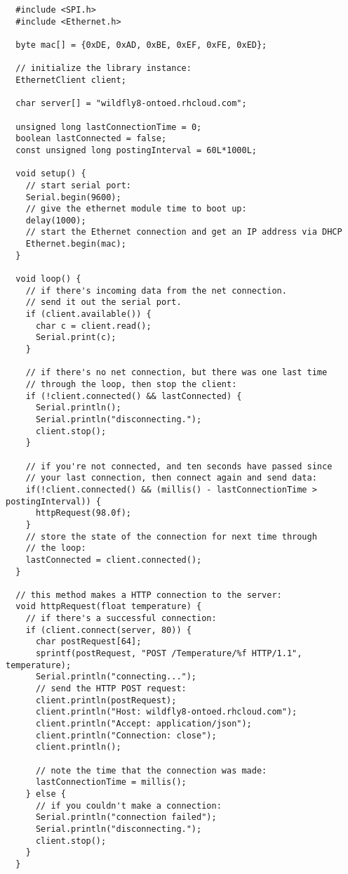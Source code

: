 \documentclass[a5paper]{tufte-book}
\begin{document}
\begin{lstlisting}
  #include <SPI.h>
  #include <Ethernet.h>

  byte mac[] = {0xDE, 0xAD, 0xBE, 0xEF, 0xFE, 0xED};

  // initialize the library instance:
  EthernetClient client;

  char server[] = "wildfly8-ontoed.rhcloud.com";

  unsigned long lastConnectionTime = 0;
  boolean lastConnected = false;
  const unsigned long postingInterval = 60L*1000L;

  void setup() {
    // start serial port:
    Serial.begin(9600);
    // give the ethernet module time to boot up:
    delay(1000);
    // start the Ethernet connection and get an IP address via DHCP
    Ethernet.begin(mac);
  }

  void loop() {
    // if there's incoming data from the net connection.
    // send it out the serial port.
    if (client.available()) {
      char c = client.read();
      Serial.print(c);
    }

    // if there's no net connection, but there was one last time
    // through the loop, then stop the client:
    if (!client.connected() && lastConnected) {
      Serial.println();
      Serial.println("disconnecting.");
      client.stop();
    }

    // if you're not connected, and ten seconds have passed since
    // your last connection, then connect again and send data:
    if(!client.connected() && (millis() - lastConnectionTime > postingInterval)) {
      httpRequest(98.0f);
    }
    // store the state of the connection for next time through
    // the loop:
    lastConnected = client.connected();
  }

  // this method makes a HTTP connection to the server:
  void httpRequest(float temperature) {
    // if there's a successful connection:
    if (client.connect(server, 80)) {
      char postRequest[64];
      sprintf(postRequest, "POST /Temperature/%f HTTP/1.1", temperature);
      Serial.println("connecting...");
      // send the HTTP POST request:
      client.println(postRequest);
      client.println("Host: wildfly8-ontoed.rhcloud.com");
      client.println("Accept: application/json");
      client.println("Connection: close");
      client.println();

      // note the time that the connection was made:
      lastConnectionTime = millis();
    } else {
      // if you couldn't make a connection:
      Serial.println("connection failed");
      Serial.println("disconnecting.");
      client.stop();
    }
  }
\end{lstlisting}
\end{document}
